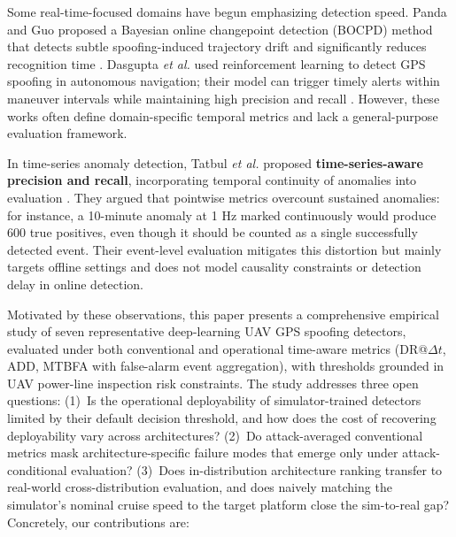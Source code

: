 \documentclass{ieeeaccess}
\begin{document}
Some real-time-focused domains have begun emphasizing detection speed. Panda and Guo proposed a Bayesian online changepoint detection (BOCPD) method that detects subtle spoofing-induced trajectory drift and significantly reduces recognition time \cite{ref16}. Dasgupta \textit{et al.} used reinforcement learning to detect GPS spoofing in autonomous navigation; their model can trigger timely alerts within maneuver intervals while maintaining high precision and recall \cite{ref17}. However, these works often define domain-specific temporal metrics and lack a general-purpose evaluation framework.

In time-series anomaly detection, Tatbul \textit{et al.} proposed \textbf{time-series-aware precision and recall}, incorporating temporal continuity of anomalies into evaluation \cite{ref18}. They argued that pointwise metrics overcount sustained anomalies: for instance, a 10-minute anomaly at 1 Hz marked continuously would produce 600 true positives, even though it should be counted as a single successfully detected event. Their event-level evaluation mitigates this distortion but mainly targets offline settings and does not model causality constraints or detection delay in online detection.

Motivated by these observations, this paper presents a comprehensive empirical
study of seven representative deep-learning UAV GPS spoofing detectors,
evaluated under both conventional and operational time-aware metrics
(DR@$\Delta t$, ADD, MTBFA with false-alarm event aggregation), with thresholds
grounded in UAV power-line inspection risk constraints.
The study addresses three open questions:
(1)~Is the operational deployability of simulator-trained detectors limited
by their default decision threshold, and how does the cost of recovering
deployability vary across architectures?
(2)~Do attack-averaged conventional metrics mask architecture-specific failure
modes that emerge only under attack-conditional evaluation?
(3)~Does in-distribution architecture ranking transfer to real-world
cross-distribution evaluation, and does naively matching the simulator's
nominal cruise speed to the target platform close the sim-to-real gap?
Concretely, our contributions are:
\end{document}
